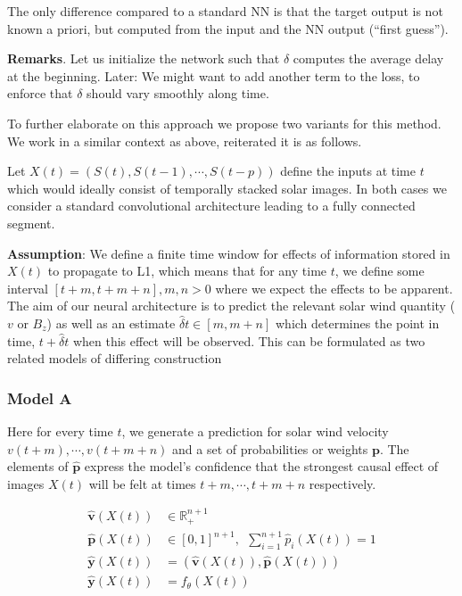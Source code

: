 \documentclass[]{article}
\theoremstyle{definition}
\begin{document}
The only difference compared to a standard NN is that the target output is not known a priori, but computed from the input and the NN output (``first guess''). 

\textbf{Remarks}. Let us initialize the network such that $\delta$ computes the average delay at the beginning. Later: We might want to add another term to the loss, to enforce that $\delta$ should vary smoothly along time.

To further elaborate on this approach we propose two variants for this method. We work in a similar context as above, reiterated it is as follows.

Let $X(t) = (S(t), S(t-1), \cdots, S(t-p))$ define the inputs at time $t$ which would ideally consist of temporally stacked solar images. In both cases we consider a standard convolutional architecture leading to a fully connected segment.

\textbf{Assumption}: We define a finite time window for effects of information stored in $X(t)$ to propagate to L1, which means that for any time $t$, we define some interval $[t+m, t+m+n], m,n > 0$ where we expect the effects to be apparent. The aim of our neural architecture is to predict the relevant solar wind quantity ($v$ or $B_z$) as well as an estimate $\hat{\delta} t \in [m, m+n]$ which determines the point in time, $t+\hat{\delta} t$ when this effect will be observed. This can be formulated as two related models of differing construction

\subsubsection*{Model A}

Here for every time $t$, we generate a prediction for solar wind velocity $v(t+m) , \cdots, v(t+m+n)$ and a set of probabilities or weights $\mathbf{p}$. The elements of $\mathbf{\hat{p}}$ express the model's confidence that the strongest causal effect of images $X(t)$ will be felt at times $t+m, \cdots, t+m+n$ respectively.

\begin{align*}
    \mathbf{\hat{v}}(X(t))  & \in \mathbb{R}_{+}^{n+1}\\
    \mathbf{\hat{p}}(X(t))  & \in [0, 1]^{n+1}, \ \ \sum_{i = 1}^{n+1}{\hat{p}_{i}(X(t))} = 1\\
    \mathbf{\hat{y}}(X(t))  & = (\mathbf{\hat{v}}(X(t)), \mathbf{\hat{p}}(X(t)))\\
    \mathbf{\hat{y}}(X(t))  & = f_{\theta}(X(t))
\end{align*}
\end{document}
